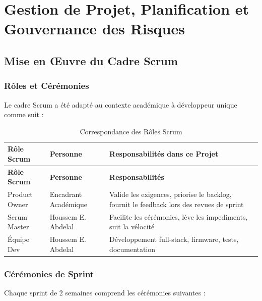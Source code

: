 \chapter{Gestion de Projet, Planification et Gouvernance des Risques}

\section{Mise en Œuvre du Cadre Scrum}

\subsection{Rôles et Cérémonies}

Le cadre Scrum a été adapté au contexte académique à développeur unique comme suit :

\begin{center}
\begin{longtable}{p{} p{} p{}}
\caption{Correspondance des Rôles Scrum}\label{tab:scrum_roles}\\
\toprule
\textbf{Rôle Scrum} & \textbf{Personne} & \textbf{Responsabilités dans ce Projet} \\
\midrule
\endfirsthead
\toprule
\textbf{Rôle Scrum} & \textbf{Personne} & \textbf{Responsabilités} \\
\midrule
\endhead
\bottomrule
\endfoot
Product Owner & Encadrant Académique & Valide les exigences, priorise le backlog, fournit le feedback lors des revues de sprint \\
Scrum Master  & Houssem E. Abdelal  & Facilite les cérémonies, lève les impediments, suit la vélocité \\
Équipe Dev    & Houssem E. Abdelal  & Développement full-stack, firmware, tests, documentation \\
\end{longtable}
\end{center}

\subsection{Cérémonies de Sprint}

Chaque sprint de 2 semaines comprend les cérémonies suivantes :

